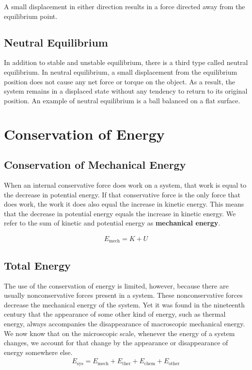 \documentclass[11pt]{article}
\begin{document}
A small displacement in either direction results in a force directed away from the equilibrium point.

\subsection{Neutral Equilibrium}

In addition to stable and unstable equilibrium, there is a third type called neutral equilibrium. In neutral equilibrium, a small displacement from the equilibrium position does not cause any net force or torque on the object. As a result, the system remains in a displaced state without any tendency to return to its original position. An example of neutral equilibrium is a ball balanced on a flat surface.


\section{Conservation of Energy}

\subsection{Conservation of Mechanical Energy}

When an internal conservative force does work on a system, that work is equal to the decrease in potential energy. If that conservative force is the only force that does work, the work it does also equal the increase in kinetic energy. This means that the decrease in potential energy equals the increase in kinetic energy. We refer to the sum of kinetic and potential energy as \textbf{mechanical energy}. 

\begin{align*}
    E_\text{mech} = K + U
\end{align*}

\subsection{Total Energy}

The use of the conservation of energy is limited, however, because there are usually nonconservative forces present in a system. These nonconservative forces decrease the mechanical energy of the system. Yet it was found in the nineteenth century that the appearance of some other kind of energy, such as thermal energy, always accompanies the disappearance of macroscopic mechanical energy. We now know that on the microscopic scale, whenever the energy of a system changes, we account for that change by the appearance or disappearance of energy somewhere else. 
\begin{align*}
    E_{\text{sys}} = E_{\text{mech}} + E_{\text{ther}} + E_{\text{chem}} + E_{\text{other}}
\end{align*}
\end{document}
